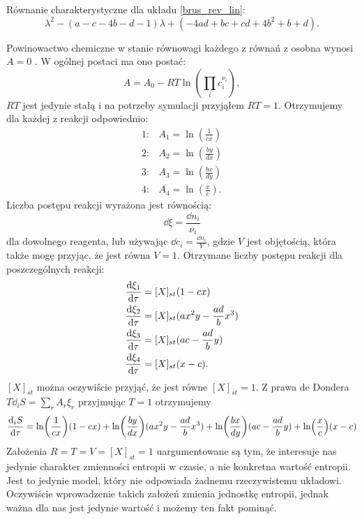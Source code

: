 \documentclass[10pt, a4paper, twoside, onecolumn]{article}
\numberwithin{equation}{section}
\begin{document}
	Równanie charakterystyczne dla układu \eqref{brus_rev_lin}:
	\begin{equation}
		\lambda^{2} - (a - c - 4b - d - 1)\lambda + (-4ad + bc + cd + 4b^{2} + b + d).
	\end{equation}\par
	Powinowactwo chemiczne w stanie równowagi każdego z równań z osobna wynosi \(A=0\) \cite{pigon1}. W ogólnej postaci ma ono postać:
	\begin{equation}
		A = A_{0} - RT\ln(\prod_{i}c_{i}^{\nu_{i}}), 
	\end{equation}
	\(RT\) jest jedynie stałą i na potrzeby symulacji przyjąłem \(RT=1\). Otrzymujemy dla każdej z reakcji odpowiednio:
	\begin{align}
		1: & A_{1} = \ln(\frac{1}{cx}) \\
		2: & A_{2} = \ln(\frac{by}{dx}) \\
		3: & A_{3} = \ln(\frac{bx}{dy}) \\
		4: & A_{4} = \ln(\frac{x}{c}).
	\end{align}
	Liczba postępu reakcji wyrażona jest równością: 
	\begin{equation}
		\dd{\xi} = \frac{\dd{n_{i}}}{\nu_{i}}
	\end{equation}
	dla dowolnego reagenta, lub używając \(\dd{c_{i}} = \frac{\dd{n_{i}}}{V}\), gdzie \(V\) jest objętością, która także mogę przyjąc, że jest równa \(V=1\). Otrzymane liczby postępu reakcji dla poszczególnych reakcji:
	\begin{align}
		\dv{\xi_{1}}{\tau} &= [X]_{st}(1 - cx) \\
		\dv{\xi_{2}}{\tau} &= [X]_{st}(ax^{2}y - \frac{ad}{b}x^{3}) \\
		\dv{\xi_{3}}{\tau} &= [X]_{st}(ac - \frac{ad}{b}y) \\
		\dv{\xi_{4}}{\tau} &= [X]_{st}(x - c).
	\end{align}
	\([X]_{st}\) można oczywiście przyjąć, że jest równe \([X]_{st}=1\). Z prawa de Dondera \(T\dd_{i}S=\sum_{r}A_{r}\xi_{r}\) przyjmując \(T=1\) otrzymujemy
	\begin{equation}
		\dv{_{i}S}{\tau} = \ln(\frac{1}{cx})(1 - cx) + \ln(\frac{by}{dx})(ax^{2}y - \frac{ad}{b}x^{3}) + \ln(\frac{bx}{dy})(ac - \frac{ad}{b}y) + \ln(\frac{x}{c})(x - c)
	\end{equation}
	Założenia \(R=T=V=[X]_{st}=1\) uargumentowane są tym, że interesuje nas jedynie charakter zmienności entropii w czasie, a nie konkretna wartość entropii. Jest to jedynie model, który nie odpowiada żadnemu rzeczywistemu układowi. Oczywiście wprowadzenie takich założeń zmienia jednostkę entropii, jednak ważna dla nas jest jedynie wartość i możemy ten fakt pominąć. \par
\end{document}
